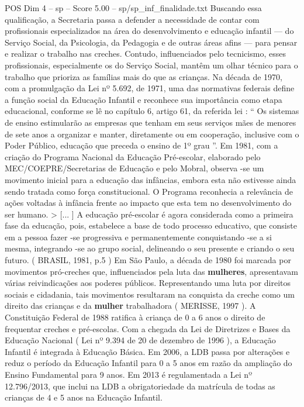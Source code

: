\begin{textsample}{POS Dim 4 – sp – Score 5.00 – sp/sp\_inf\_finalidade.txt}
Buscando essa qualificação, a Secretaria passa a defender a necessidade de contar com profissionais especializados na área do desenvolvimento e educação infantil — do Serviço Social, da Psicologia, da Pedagogia e de outras áreas afins — para pensar e realizar o trabalho nas creches.
Contudo, influenciados pelo tecnicismo, esses profissionais, especialmente os do Serviço Social, mantêm um olhar técnico para o trabalho que prioriza as famílias mais do que as crianças.
Na década de 1970, com a promulgação da Lei nº 5.692, de 1971, uma das normativas federais define a função social da Educação Infantil e reconhece sua importância como etapa educacional, conforme se lê no capítulo 6, artigo 61, da referida lei : “ Os sistemas de ensino estimularão as empresas que tenham em seus serviços mães de menores de sete anos a organizar e manter, diretamente ou em cooperação, inclusive com o Poder Público, educação que preceda o ensino de 1º grau ”.
Em 1981, com a criação do Programa Nacional da Educação Pré-escolar, elaborado pelo MEC/COEPRE/Secretarias de Educação e pelo Mobral, observa -se um movimento inicial para a educação das infâncias, embora esta não estivesse ainda sendo tratada como força constitucional.
O Programa reconhecia a relevância de ações voltadas à infância frente ao impacto que esta tem no desenvolvimento do ser humano. > [... ] A educação pré-escolar é agora considerada como a primeira fase da educação, pois, estabelece a base de todo processo educativo, que consiste em a pessoa fazer -se progressiva e permanentemente conquistando -se a si mesma, integrando -se ao grupo social, delineando o seu presente e criando o seu futuro. ( BRASIL, 1981, p.5 ) Em São Paulo, a década de 1980 foi marcada por movimentos pró-creches que, influenciados pela luta das \textbf{mulheres}, apresentavam várias reivindicações aos poderes públicos.
Representando uma luta por direitos sociais e cidadania, tais movimentos resultaram na conquista da creche como um direito das crianças e da \textbf{mulher} trabalhadora ( MERISSE, 1997 ).
A Constituição Federal de 1988 ratifica à criança de 0 a 6 anos o direito de frequentar creches e pré-escolas.
Com a chegada da Lei de Diretrizes e Bases da Educação Nacional ( Lei nº 9.394 de 20 de dezembro de 1996 ), a Educação Infantil é integrada à Educação Básica.
Em 2006, a LDB passa por alterações e reduz o período da Educação Infantil para 0 a 5 anos em razão da ampliação do Ensino Fundamental para 9 anos.
Em 2013 é regulamentada a Lei nº 12.796/2013, que inclui na LDB a obrigatoriedade da matrícula de todas as crianças de 4 e 5 anos na Educação Infantil.

\end{textsample}
